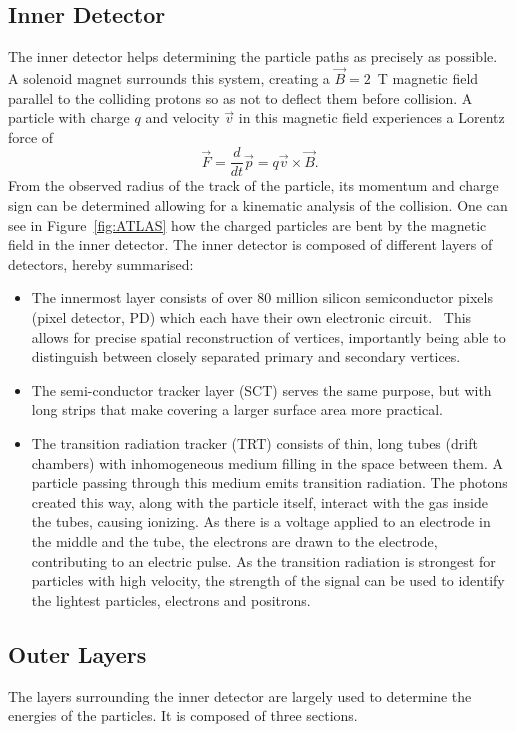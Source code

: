 \documentclass[twocolumn]{article}
\begin{document}
\subsection{Inner Detector}
The inner detector helps determining the particle paths as precisely as possible. A solenoid magnet surrounds this system, creating a $\vec{B} = 2$~T magnetic field parallel to the colliding protons so as not to deflect them before collision. A particle with charge $q$ and velocity $\vec{v}$ in this magnetic field experiences a Lorentz force of 
\begin{equation}
\vec{F} = \frac{d}{dt} \vec{p} = q \vec{v} \times \vec{B}.\nonumber
\end{equation}
From the observed radius of the track of the particle, its momentum and charge sign can be determined allowing for a kinematic analysis of the collision. One can see in Figure~\ref{fig:ATLAS} how the charged particles are bent by the magnetic field in the inner detector. The inner detector is composed of different layers of detectors, hereby summarised:
\begin{itemize}
\item The innermost layer consists of over 80 million silicon semiconductor pixels (pixel detector, PD) which each have their own electronic circuit.~\cite{manual} This allows for precise spatial reconstruction of vertices, importantly being able to distinguish between closely separated primary and secondary vertices.
\item The semi-conductor tracker layer (SCT) serves the same purpose, but with long strips that make covering a larger surface area more practical.
\item The transition radiation tracker (TRT) consists of thin, long tubes (drift chambers) with inhomogeneous medium filling in the space between them. A particle passing through this medium emits transition radiation. The photons created this way, along with the particle itself, interact with the gas inside the tubes, causing ionizing. As there is a voltage applied to an electrode in the middle and the tube, the electrons are drawn to the electrode, contributing to an electric pulse. As the transition radiation is strongest for particles with high velocity, the strength of the signal can be used to identify the lightest particles, electrons and positrons.
\end{itemize}

\subsection{Outer Layers}
The layers surrounding the inner detector are largely used to determine the energies of the particles. It is composed of three sections.
\end{document}
